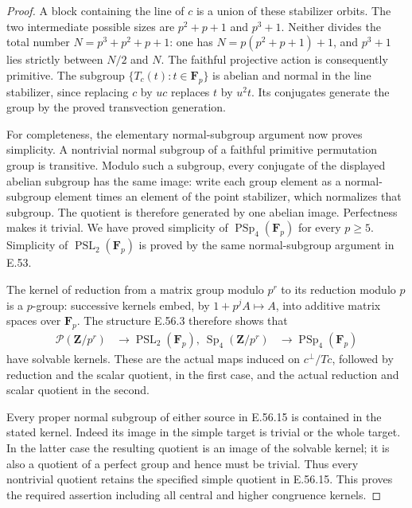 \begin{proof}
A block containing the line of $c$ is a union
of these stabilizer orbits. The two intermediate
possible sizes are $p^2+p+1$ and $p^3+1$.
Neither divides the total number
$N=p^3+p^2+p+1$: one has
$N=p(p^2+p+1)+1$, and $p^3+1$ lies strictly
between $N/2$ and $N$. The faithful projective
action is consequently primitive.
The subgroup $\{T_c(t):t\in\mathbf F_p\}$ is
abelian and normal in the line stabilizer, since
replacing $c$ by $uc$ replaces $t$ by $u^2t$.
Its conjugates generate the group by the proved
transvection generation.

For completeness, the elementary normal-subgroup
argument now proves simplicity. A nontrivial normal
subgroup of a faithful primitive permutation group
is transitive. Modulo such a subgroup, every
conjugate of the displayed abelian subgroup has
the same image: write each group element as a
normal-subgroup element times an element of the
point stabilizer, which normalizes that subgroup.
The quotient is therefore generated by one
abelian image. Perfectness makes it trivial.
We have proved simplicity of
$\operatorname{PSp}_4(\mathbf F_p)$ for every
$p\ge5$. Simplicity of
$\operatorname{PSL}_2(\mathbf F_p)$ is proved
by the same normal-subgroup argument in E.53.

The kernel of reduction from a matrix group
modulo $p^r$ to its reduction modulo $p$ is
a $p$-group: successive kernels embed, by
$1+p^jA\mapsto A$, into additive matrix spaces
over $\mathbf F_p$.
The structure E.56.3 therefore shows that
\[
 \begin{split}
 \mathcal P(\mathbf Z/p^r)&\longrightarrow
                         \operatorname{PSL}_2(\mathbf F_p),\
 \operatorname{Sp}_4(\mathbf Z/p^r)&\longrightarrow
                         \operatorname{PSp}_4(\mathbf F_p)
 \end{split}
 \tag{E.56.15}
\]
have solvable kernels. These are the actual
maps induced on $c^\perp/Tc$, followed by
reduction and the scalar quotient, in the first
case, and the actual reduction and scalar
quotient in the second.

Every proper normal subgroup of either source
in E.56.15 is contained in the stated kernel.
Indeed its image in the simple target is
trivial or the whole target. In the latter
case the resulting quotient is an image of
the solvable kernel; it is also a quotient of
a perfect group and hence must be trivial.
Thus every nontrivial quotient retains the
specified simple quotient in E.56.15.
This proves the required assertion including
all central and higher congruence kernels.


\end{proof}
